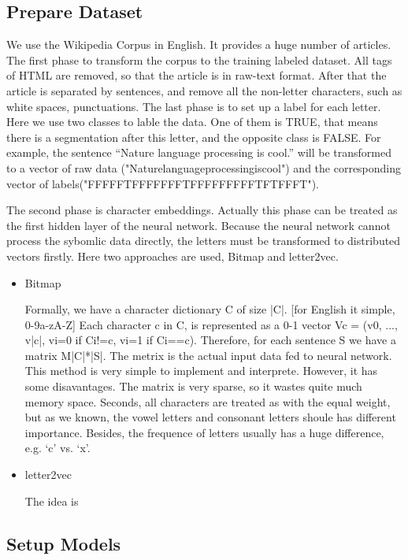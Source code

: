 \documentclass[11pt]{article}
\begin{document}
\subsection{Prepare Dataset}
We use the Wikipedia Corpus in English. It provides a huge number of articles. The first phase to transform the corpus to the training labeled dataset. All tags of HTML are removed, so that the article is in raw-text format. After that the article is separated by sentences, and remove all the non-letter characters, such as white spaces, punctuations. The last phase is to set up a label for each letter. Here we use two classes to lable the data. One of them is TRUE, that means there is a segmentation after this letter, and the opposite class is FALSE. For example, the sentence ``Nature language processing is cool.'' will be transformed to a vector of raw data ("Naturelanguageprocessingiscool") and the corresponding vector of labels("FFFFFTFFFFFFFTFFFFFFFFFTFTFFFT"). 


The second phase is character embeddings. Actually this phase can be treated as the first hidden layer of the neural network. Because the neural network cannot process the sybomlic data directly, the letters must be transformed to distributed vectors firstly. Here two approaches are used, Bitmap and letter2vec. 

\begin{itemize}
\item Bitmap

Formally, we have a character dictionary C of size |C|. [for English it simple, 0-9a-zA-Z] Each character c in C, is represented as a 0-1 vector Vc = (v0, ..., v|c|, vi=0 if Ci!=c, vi=1 if Ci==c). Therefore, for each sentence S we have a matrix M{|C|*|S|}. The metrix is the actual input data fed to neural network. 
This method is very simple to implement and interprete. However, it has some disavantages. The matrix is very sparse, so it wastes quite much memory space. Seconds, all characters are treated as with the equal weight, but as we known, the vowel letters and consonant letters shoule has different importance. Besides, the frequence of letters usually has a huge difference, e.g. `c' vs. `x'. 
\item letter2vec

The idea is 
\end{itemize}

\subsection{Setup Models}
\end{document}
